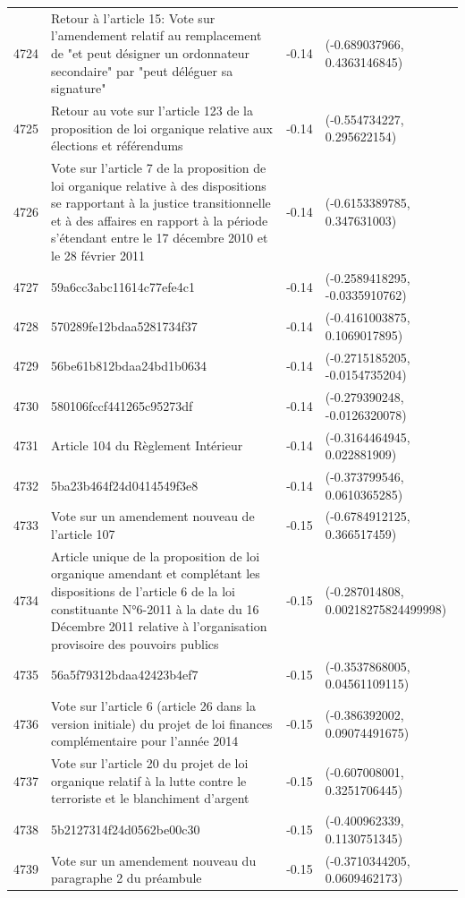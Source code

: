 \begin{table}[ht]
\begin{tabular}{rlrl}
  4724 & Retour à l'article 15: Vote sur l'amendement relatif au remplacement de "et peut désigner un ordonnateur secondaire" par "peut  déléguer sa signature" & -0.14 & (-0.689037966, 0.4363146845) \\ 
  4725 & Retour au vote sur l'article 123 de la proposition de loi organique relative aux élections et référendums & -0.14 & (-0.554734227, 0.295622154) \\ 
  4726 & Vote sur l'article 7 de la proposition de loi organique relative à des dispositions se rapportant à la justice transitionnelle et à des affaires en rapport à la période s'étendant entre le 17 décembre 2010 et le 28 février 2011 & -0.14 & (-0.6153389785, 0.347631003) \\ 
  4727 & 59a6cc3abc11614c77efe4c1 & -0.14 & (-0.2589418295, -0.0335910762) \\ 
  4728 & 570289fe12bdaa5281734f37 & -0.14 & (-0.4161003875, 0.1069017895) \\ 
  4729 & 56be61b812bdaa24bd1b0634 & -0.14 & (-0.2715185205, -0.0154735204) \\ 
  4730 & 580106fccf441265c95273df & -0.14 & (-0.279390248, -0.0126320078) \\ 
  4731 & Article 104 du Règlement Intérieur & -0.14 & (-0.3164464945, 0.022881909) \\ 
  4732 & 5ba23b464f24d0414549f3e8 & -0.14 & (-0.373799546, 0.0610365285) \\ 
  4733 & Vote sur un amendement nouveau de l'article 107 & -0.15 & (-0.6784912125, 0.366517459) \\ 
  4734 & Article unique de la proposition de loi organique amendant et complétant les dispositions de l'article 6 de la loi constituante N°6-2011 à la date du 16 Décembre 2011 relative à l'organisation provisoire des pouvoirs publics & -0.15 & (-0.287014808, 0.00218275824499998) \\ 
  4735 & 56a5f79312bdaa42423b4ef7 & -0.15 & (-0.3537868005, 0.04561109115) \\ 
  4736 & Vote sur l'article 6 (article 26 dans la version initiale) du projet de loi finances complémentaire pour l'année 2014 & -0.15 & (-0.386392002, 0.09074491675) \\ 
  4737 & Vote sur l'article 20 du projet de loi organique relatif à la lutte contre le terroriste et le blanchiment d'argent & -0.15 & (-0.607008001, 0.3251706445) \\ 
  4738 & 5b2127314f24d0562be00c30 & -0.15 & (-0.400962339, 0.1130751345) \\ 
  4739 & Vote sur un amendement nouveau du paragraphe 2 du préambule & -0.15 & (-0.3710344205, 0.0609462173) \\ 

\end{tabular}
\end{table}

